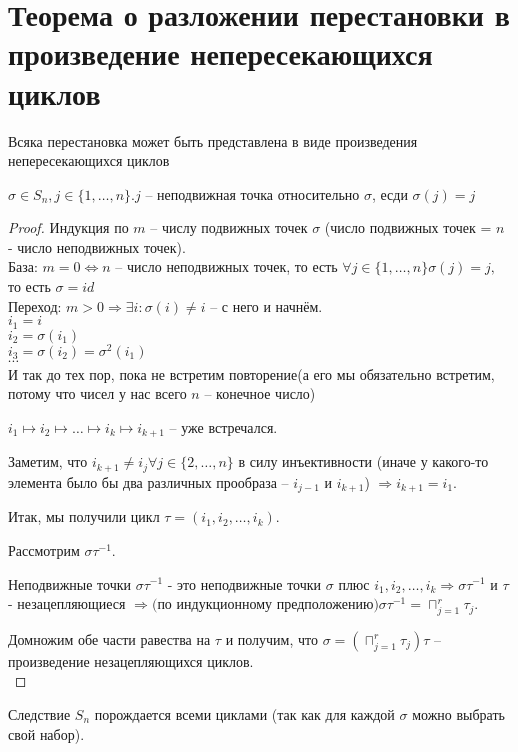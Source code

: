 \section{Теорема о разложении перестановки в произведение непересекающихся циклов}

\begin{theorem}{Всяка перестановка может быть представлена в виде произведения непересекающихся циклов}
\begin{Def}
	$\sigma \in S_n, j \in \{1, \dotsc, n\}. j$ -- неподвижная точка относительно $\sigma$, есди $\sigma(j) = j$
\end{Def}
\end{theorem}
\begin{proof}
	Индукция по $m$ -- числу подвижных точек $\sigma$ (число подвижных точек = $n$ - число неподвижных точек).\\
База: $m = 0 \Leftrightarrow n $ -- число неподвижных точек, то есть $\forall j \in \{1, \dotsc, n\} \sigma(j) = j, $ то есть $\sigma = id$\\
Переход: $m > 0 \Rightarrow \exists i: \sigma(i) \ne i$ -- с него и начнём.\\
$i_1 = i$\\
$i_2 = \sigma(i_1)$\\
$i_3 = \sigma(i_2) = \sigma^2(i_1)$\\
$\dotsb$\\
И так до тех пор, пока не встретим повторение(а его мы обязательно встретим, потому что чисел у нас всего $n$ -- конечное число)

$i_1 \mapsto i_2 \mapsto \dotsc \mapsto i_k \mapsto i_{k+1}$ -- уже встречался. 

Заметим, что $i_{k+1} \ne i_j \forall j \in \{2, \dotsc, n\}$ в силу инъективности \sigma (иначе у какого-то элемента было бы два различных прообраза -- $i_{j-1}$ и $i_{k+1}$) $\Rightarrow i_{k+1} = i_1$.  

Итак, мы получили цикл $\tau = (i_1, i_2, \dotsc, i_k)$. 

Рассмотрим $\sigma\tau^{-1}$. 

Неподвижные точки $\sigma\tau^{-1}$ - это неподвижные точки $\sigma $ плюс $i_1, i_2, \dotsc, i_k \Rightarrow \sigma\tau^{-1}$ и $\tau$ - незацепляющиеся $\Rightarrow($по индукционному предположению$) \sigma\tau^{-1} = \sqcap_{j = 1}^r \tau_j$. 

Домножим обе части равества на $\tau$ и получим, что $\sigma = (\sqcap_{j = 1}^r \tau_j)\tau$ -- произведение незацепляющихся циклов.\\
\end{proof}
\begin{theorem}{Следствие}
$S_n$ порождается всеми циклами (так как для каждой $\sigma$ можно выбрать свой набор).
\end{theorem}

